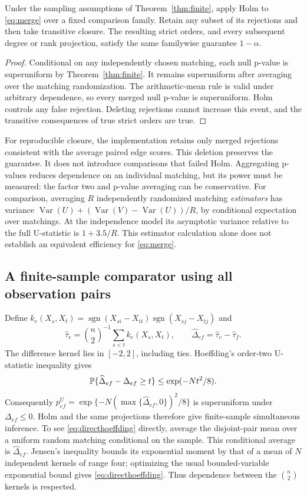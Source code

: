 \begin{proposition}\label{prop:merge}
Under the sampling assumptions of Theorem~\ref{thm:finite}, apply Holm to \eqref{eq:merge} over a fixed comparison family. Retain any subset of its rejections and then take transitive closure. The resulting strict orders, and every subsequent degree or rank projection, satisfy the same familywise guarantee $1-\alpha$.
\end{proposition}
\begin{proof}
Conditional on any independently chosen matching, each null p-value is superuniform by Theorem~\ref{thm:finite}. It remains superuniform after averaging over the matching randomization. The arithmetic-mean rule is valid under arbitrary dependence, so every merged null p-value is superuniform. Holm controls any false rejection. Deleting rejections cannot increase this event, and the transitive consequences of true strict orders are true.
\end{proof}
For reproducible closure, the implementation retains only merged rejections consistent with the average paired edge scores. This deletion preserves the guarantee. It does not introduce comparisons that failed Holm. Aggregating p-values reduces dependence on an individual matching, but its power must be measured: the factor two and p-value averaging can be conservative. For comparison, averaging $R$ independently randomized matching \emph{estimators} has variance $\operatorname{Var}(U)+(\operatorname{Var}(V)-\operatorname{Var}(U))/R$, by conditional expectation over matchings. At the independence model its asymptotic variance relative to the full U-statistic is $1+3.5/R$. This estimator calculation alone does not establish an equivalent efficiency for \eqref{eq:merge}.

\subsection{A finite-sample comparator using all observation pairs}
Define $k_e(X_s,X_t)=\operatorname{sgn}(X_{si}-X_{ti})\operatorname{sgn}(X_{sj}-X_{tj})$ and
\[
 \widehat\tau_e={\binom n2}^{-1}\sum_{s<t} k_e(X_s,X_t),\qquad
 \widehat\Delta_{ef}=\widehat\tau_e-\widehat\tau_f.
\]
The difference kernel lies in $[-2,2]$, including ties. Hoeffding's order-two U-statistic inequality \citep{hoeffding1963} gives
\begin{equation}\label{eq:directhoeffding}
 \mathbb P\{\widehat\Delta_{ef}-\Delta_{ef}\ge t\}
 \le \exp(-Nt^2/8).
\end{equation}
Consequently $p^{U}_{ef}=\exp\{-N(\max\{\widehat\Delta_{ef},0\})^2/8\}$ is superuniform under $\Delta_{ef}\le0$. Holm and the same projections therefore give finite-sample simultaneous inference. To see \eqref{eq:directhoeffding} directly, average the disjoint-pair mean over a uniform random matching conditional on the sample. This conditional average is $\widehat\Delta_{ef}$. Jensen's inequality bounds its exponential moment by that of a mean of $N$ independent kernels of range four; optimizing the usual bounded-variable exponential bound gives \eqref{eq:directhoeffding}. Thus dependence between the $\binom n2$ kernels is respected.

